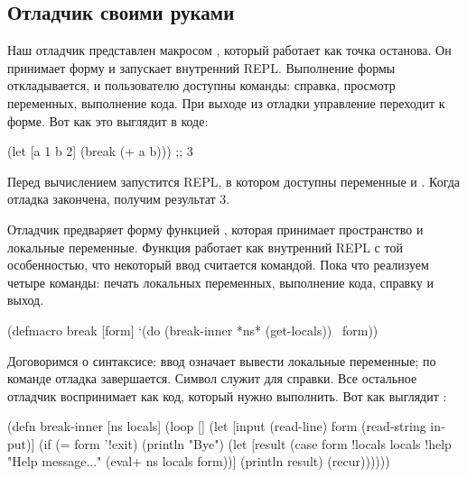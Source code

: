 \subsection{Отладчик своими руками}

\label{section-own-debugger}

Наш отладчик представлен макросом , который работает как точка останова. Он принимает форму и запускает внутренний REPL. Выполнение формы откладывается, и пользователю доступны команды: справка, просмотр переменных, выполнение кода. При выходе из отладки управление переходит к форме. Вот как это выглядит в коде:

\begin{english}
  \begin{clojure}
(let [a 1
      b 2]
  (break (+ a b)))
;; 3
  \end{clojure}
\end{english}

Перед вычислением  запустится REPL, в котором доступны переменные  и . Когда отладка закончена, получим результат 3.

Отладчик предваряет форму функцией , которая принимает пространство и локальные переменные. Функция  работает как внутренний REPL с той особенностью, что некоторый ввод считается командой. Пока что реализуем четыре команды: печать локальных переменных, выполнение кода, справку и выход.

\begin{english}
  \begin{clojure}
(defmacro break [form]
  `(do
     (break-inner *ns* (get-locals))
     ~form))
  \end{clojure}
\end{english}

Договоримся о синтаксисе: ввод  означает вывести локальные переменные; по команде  отладка завершается. Символ  служит для справки. Все остальное отладчик воспринимает как код, который нужно выполнить. Вот как выглядит :

\begin{english}
  \begin{clojure}
(defn break-inner [ns locals]
  (loop []
    (let [input (read-line)
          form (read-string input)]
      (if (= form '!exit)
        (println "Bye")
        (let [result
              (case form
                !locals locals
                !help "Help message..."
                (eval+ ns locals form))]
          (println result)
          (recur))))))
  \end{clojure}
\end{english}

